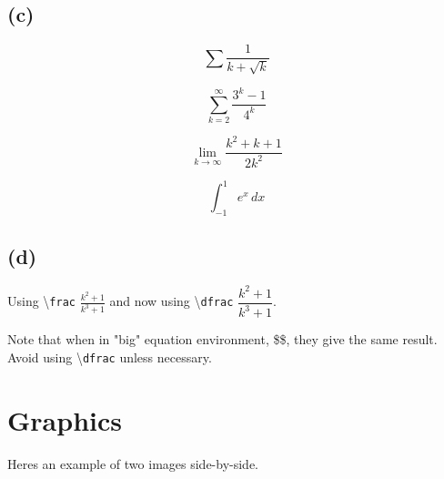 \documentclass[11pt, a4paper]{article}
\begin{document}
\subsection{(c)} %

$$\sum \frac{1}{k+\sqrt{k}}$$

$$\sum\limits_{k=2}^\infty \frac{3^k-1}{4^k}$$

$$\lim_{k \to \infty} \frac{k^2 + k + 1}{2k^2}$$

$$\int_{-1}^{1} e^{x} \, dx$$

\subsection{(d)} %

Using \textbackslash \texttt{frac} $\frac{k^2+1}{k^3+1}$ and now using \textbackslash \texttt{dfrac} $\dfrac{k^2+1}{k^3+1}$.

Note that when in "big" equation environment, \$\$, they give the same result. Avoid using \textbackslash \texttt{dfrac} unless necessary.
\newpage


\section{Graphics}

Heres an example of two images side-by-side.
\end{document}
